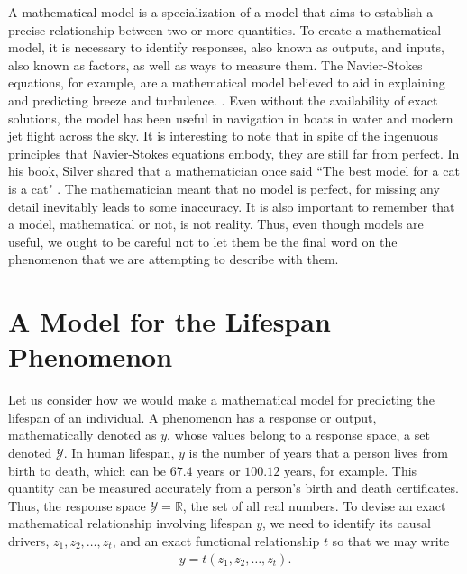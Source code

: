 \documentclass[12pt]{article}
\begin{document}
	A mathematical model is a specialization of a model that aims to establish a
	precise relationship between two or more quantities. To create a mathematical model,
	it is necessary to identify responses, also known as outputs, and inputs, also known
	as factors, as well as ways to measure them. The Navier-Stokes equations, for example, 
	are a mathematical model believed to aid in explaining and predicting breeze and turbulence.
	\cite{Clay-navier-stokes}. Even without the availability of exact solutions, the model has
	been useful in navigation in boats in water and modern jet flight across the sky.
	It is interesting to note that in spite of the ingenuous principles
	that Navier-Stokes equations embody, they are still far from perfect.
	In his book, Silver shared that a mathematician once said ``The best model for a cat is a cat"
	\cite{Silver-signal-and-noise}. The mathematician meant that no model is perfect, for
	missing any detail inevitably leads to some inaccuracy. It is also important
	to remember that a model, mathematical or not, is not reality. Thus, even though
	models are useful, we ought to be careful not to let them be the final word on
	the phenomenon that we are attempting to describe with them.
	
	\section{A Model for the Lifespan Phenomenon}
	
	Let us consider how we would make a mathematical model for predicting the lifespan
	of an individual. A phenomenon has a response or output, mathematically denoted as $y$,
	whose values belong to a response space, a set denoted $\mathcal{Y}$. In human lifespan,
	$y$ is the number of years that a person lives from birth to death, which can be $67.4$ years
	or $100.12$ years, for example. This quantity can be measured accurately from a person's birth
	and death certificates.	 Thus, the response space $\mathcal{Y}=\mathbb{R}$, the set of all
	real numbers. To devise an exact mathematical relationship involving lifespan $y$,
	we need to identify its causal drivers, $z_1,z_2,\ldots,z_t$, and an exact functional
	relationship $t$ so that we may write
	\begin{align*}
		y = t(z_1,z_2,\ldots,z_t).
	\end{align*}
	
\end{document}
